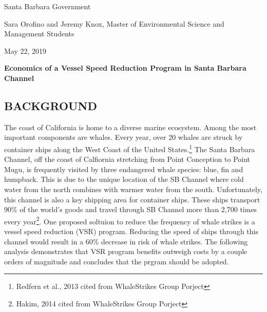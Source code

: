 \documentclass[10pt,]{article}
\title{}
\author{}
\date{}
\let\rmarkdownfootnote\footnote%
\def\footnote{\protect\rmarkdownfootnote}
\begin{document}
\vspace{-85pt}  \newline
\vspace{-18pt} \noindent\makebox[\linewidth]{\rule{\textwidth}{0.4pt}}
\vspace{-18pt} 

\begin{description}[leftmargin=!,itemsep=-1ex,labelwidth=\widthof{Subject:  }]
  \item[To:] Santa Barbara Government 
  \item[From:] Sara Orofino and Jeremy Knox, Master of Environmental Science and Management Students
  \item[Date:] May 22, 2019
  \item[Subject:] \bfseries{Economics of a Vessel Speed Reduction Program in Santa Barbara Channel}
\end{description}

\vspace{-10pt} \noindent\makebox[\linewidth]{\rule{\textwidth}{0.4pt}}
\vspace{-25pt}

\subsection{BACKGROUND}\label{background}

\vspace{-10pt}

The coast of California is home to a diverse marine ecosystem. Among the
most important components are whales. Every year, over 20 whales are
struck by container ships along the West Coast of the United
States.\footnote{Redfern et al., 2013 cited from WhaleStrikes Group
  Porject} The Santa Barbara Channel, off the coast of Calfiornia
stretching from Point Conception to Point Mugu, is frequently visited by
three endangered whale species: blue, fin and humpback. This is due to
the unique location of the SB Channel where cold water from the north
combines with warmer water from the south. Unfortunately, this channel
is also a key shipping area for container ships. These ships transport
90\% of the world's goods and travel through SB Channel more than 2,700
times every year\footnote{Hakim, 2014 cited from WhaleStrikes Group
  Porject}. One proposed soltuion to reduce the frequency of whale
strikes is a vessel speed reduction (VSR) program. Reducing the speed of
ships through this channel would result in a 60\% decrease in risk of
whale strikes. The following analysis demonstrates that VSR program
benefits outweigh costs by a couple orders of magnitude and concludes
that the prgram should be adopted.
\end{document}
